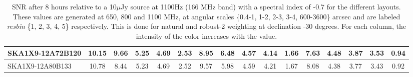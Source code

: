 \begin{table}[htp]
{{\begin{tabular}{|lccccc||ccccc||ccccc|}
SKA1X9-12A72B120 & 10.15 \cellcolor{blue!47.58} & 9.66 \cellcolor{red!42.34} & 5.25 \cellcolor{green!19.62} & 4.69 \cellcolor{orange!18.00} & 2.53 \cellcolor{purple!29.67} & 8.95 \cellcolor{blue!46.78} & 6.48 \cellcolor{red!24.47} & 4.57 \cellcolor{green!18.00} & 4.14 \cellcolor{orange!18.00} & 1.66 \cellcolor{purple!18.00} & 7.63 \cellcolor{blue!51.45} & 4.48 \cellcolor{red!22.42} & 3.87 \cellcolor{green!25.37} & 3.53 \cellcolor{orange!24.77} & 0.94 \cellcolor{purple!30.00}\\ \hline 
SKA1X9-12A80B133 & 10.78 \cellcolor{blue!60.00} & 8.44 \cellcolor{red!30.87} & 5.23 \cellcolor{green!18.00} & 4.69 \cellcolor{orange!18.00} & 2.52 \cellcolor{purple!27.33} & 9.57 \cellcolor{blue!60.00} & 5.98 \cellcolor{red!18.79} & 4.59 \cellcolor{green!19.83} & 4.21 \cellcolor{orange!22.90} & 1.67 \cellcolor{purple!22.67} & 8.08 \cellcolor{blue!60.00} & 4.38 \cellcolor{red!18.00} & 3.77 \cellcolor{green!18.00} & 3.43 \cellcolor{orange!18.00} & 0.92 \cellcolor{purple!18.00}\\ \hline 
\end{tabular}}
\vspace{-0.300000cm}
\hspace{1cm} 

\vspace{.25cm}
\caption{SNR after 8 hours relative to a 10$\mu$Jy source at 1100Hz (166 MHz band) with a spectral index of -0.7 for the different layouts. These values are generated at 650, 800 and 1100 MHz, at angular scales \{0.4-1, 1-2, 2-3, 3-4, 600-3600\} arcsec and are labeled {\it resbin} \{1, 2, 3, 4, 5\} respectively. This is done for natural and robust-2 weighting at declination -30 degrees. For each column, the intensity of the color increases with the value.}\label{tab:snr10}}
 \end{table}
